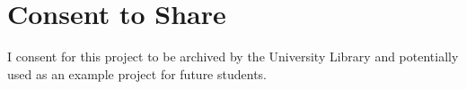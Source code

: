\documentclass[bsc]{abdnthesis}
\begin{document}
\section*{Consent to Share}
I consent for this project to be archived by the University Library and potentially used as an example project for future students.

\newcommand{\autorefp}[1]{\autoref{#1} (p\pageref*{#1})}

\newcommand{\autorefnp}[1]{\autoref{#1} ``\nameref{#1}'', (p\pageref*{#1})}

\newcommand{\see}[1]{\hyperref[#1]{(see \autoref*{#1}, p\pageref*{#1})}}

\newcommand{\seenamed}[1]{\hyperref[#1]{(see \autoref*{#1} ``\nameref*{#1}'', p.\pageref*{#1})}}

\newcommand{\bq}[2][]{\singlespacing \begin{quote} 
\begin{small} ``\textit{#2}'' \end{small} #1 \end{quote} \doublespacing}

\newcommand{\qq}[1]{{\enquote{\textit{#1}}}}


\tableofcontents
\listoftables
\listoffigures
\end{document}
